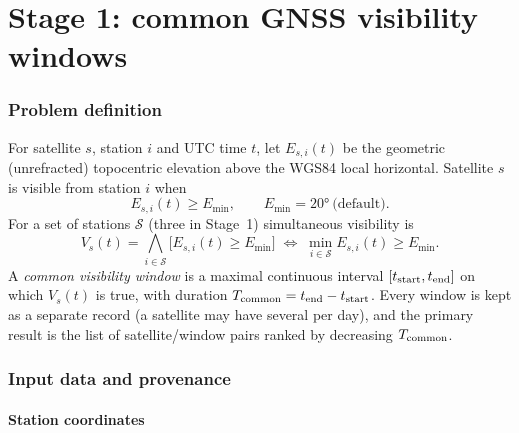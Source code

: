\documentclass[11pt,a4paper]{article}
\begin{document}
\part{Stage 1: common GNSS visibility windows}

\section{Problem definition}

For satellite $s$, station $i$ and UTC time $t$, let $E_{s,i}(t)$ be the
geometric (unrefracted) topocentric elevation above the WGS84 local
horizontal. Satellite $s$ is visible from station $i$ when
\begin{equation}
E_{s,i}(t) \ge E_{\min}, \qquad E_{\min} = \ang{20}\ \text{(default)}.
\end{equation}
For a set of stations $\mathcal{S}$ (three in Stage~1) simultaneous
visibility is
\begin{equation}
V_s(t) = \bigwedge_{i\in\mathcal{S}} \bigl[E_{s,i}(t)\ge E_{\min}\bigr]
\;\Longleftrightarrow\; \min_{i\in\mathcal{S}} E_{s,i}(t) \ge E_{\min}.
\label{eq:common}
\end{equation}
A \emph{common visibility window} is a maximal continuous interval
$[t_{\rm start},t_{\rm end}]$ on which $V_s(t)$ is true, with duration
$T_{\rm common}=t_{\rm end}-t_{\rm start}$. Every window is kept as a separate
record (a satellite may have several per day), and the primary result is the
list of satellite/window pairs ranked by decreasing $T_{\rm common}$.

\section{Input data and provenance}

\subsection{Station coordinates}
\end{document}
